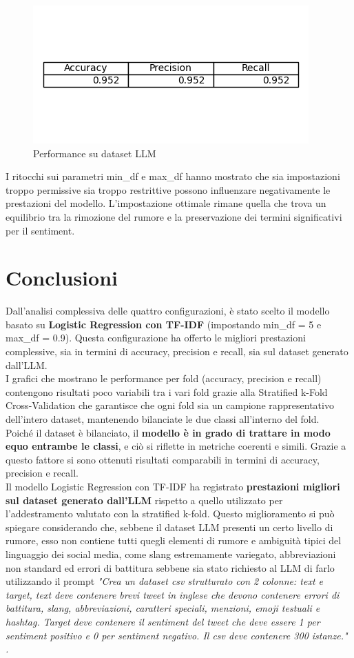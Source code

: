 \documentclass[12pt,a4paper]{report} %
\begin{document}
\begin{figure}[H]
    \centering
    \includegraphics[width=0.75\linewidth]{immagini_modeling/parameter_6.png}
    \caption{Performance su dataset LLM}
    \label{fig:enter-label}
\end{figure}
I ritocchi sui parametri min\_df e max\_df hanno mostrato che sia impostazioni troppo permissive sia troppo restrittive possono influenzare negativamente le prestazioni del modello. L’impostazione ottimale rimane quella che trova un equilibrio tra la rimozione del rumore e la preservazione dei termini significativi per il sentiment. 
\section{Conclusioni}
Dall’analisi complessiva delle quattro configurazioni, è stato scelto il modello basato su \textbf{Logistic Regression con TF-IDF} (impostando min\_df = 5 e max\_df = 0.9). Questa configurazione ha offerto le migliori prestazioni complessive, sia in termini di accuracy, precision e recall, sia sul dataset generato dall’LLM. \\I grafici che mostrano le performance per fold (accuracy, precision e recall) contengono risultati poco variabili tra i vari fold grazie alla Stratified k-Fold Cross-Validation che garantisce che ogni fold sia un campione rappresentativo dell’intero dataset, mantenendo bilanciate le due classi all'interno del fold. \\Poiché il dataset è bilanciato, il \textbf{modello è in grado di trattare in modo equo entrambe le classi}, e ciò si riflette in metriche coerenti e simili. Grazie a questo fattore si sono ottenuti risultati comparabili in termini di accuracy, precision e recall. \\Il modello Logistic Regression con TF-IDF ha registrato \textbf{prestazioni migliori sul dataset generato dall’LLM} rispetto a quello utilizzato per l’addestramento valutato con la stratified k-fold. Questo miglioramento si può spiegare considerando che, sebbene il dataset LLM presenti un certo livello di rumore, esso non contiene tutti quegli elementi di rumore e ambiguità tipici del linguaggio dei social media, come slang estremamente variegato, abbreviazioni non standard ed errori di battitura sebbene sia stato richiesto al LLM di farlo utilizzando il prompt \textit{"Crea un dataset csv strutturato con 2 colonne: text e target, text deve contenere brevi tweet in inglese che devono contenere errori di battitura, slang, abbreviazioni, caratteri speciali, menzioni, emoji testuali e hashtag. Target deve contenere il sentiment del tweet che deve essere 1 per sentiment positivo e 0 per sentiment negativo. Il csv deve contenere 300 istanze." .}
\end{document}
